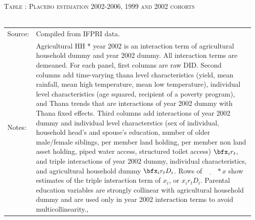 \begin{table}\hfil\textsc{\footnotesize Table \thetable: Placebo estimation 2002-2006, 1999 and 2002 cohorts\label{zEm.1999.10.sameN}}\\\setlength{\tabcolsep}{.5pt}\renewcommand{\arraystretch}{.675}\hspace{-2em}\hfil\\\renewcommand{\arraystretch}{1}\hfil\begin{tabular}{>{\hfill\scriptsize}p{1cm}<{}>{\scriptsize}p{12cm}<{\hfill}} Source:& Compiled from IFPRI data. \\[-1ex] Notes:&   \textsf{Agricultural HH * year 2002} is an interaction term of agricultural household dummy and year 2002 dummy. All interaction terms are demeaned. For each panel, first columns are raw DID. Second columns add time-varying thana level characteristics (yield, mean rainfall, mean high temperature, mean low temperature), individual level characteristics (age squared, recipient of a poverty program), and \textsf{Thana trends} that are interactions of year 2002 dummy with Thana fixed effects. Third columns add interactions of year 2002 dummy and individual level characterstics (sex of individual, household head's and spouse's education, number of older male/female siblings, per member land holding, per member non land asset holding, piped water access, structured toilet access) $\bfx_{i}r_{t}$, and triple interactions of year 2002 dummy, individual characteristics, and agricultural household dummy $\bfx_{i}r_{t}D_{i}$. Rows of $\underline{\phantom{mm}}*x$ show estimates of the triple interaction term of $x_{i}$, or $x_{i}r_{t}D_{i}$. Parental education variables are strongly collinear with agricultural household dummy and are used only in year 2002 interaction terms to avoid multicollinearity., \\   \end{tabular} \end{table}

